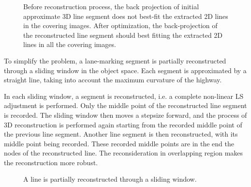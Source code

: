 \begin{figure} [h!]
	\centering
	
	\caption{\small Before reconstruction process, the back projection of initial approximate 3D line segment does not best-fit the extracted 2D lines in the covering images. After optimization, the back-projection of the reconstructed line segment should best fitting the extracted 2D lines in all the covering images.}
	\label{fig:mainidea}
\end{figure}


To simplify the problem, a lane-marking segment is partially reconstructed through a sliding window in the object space. Each segment is approximated by a straight line, taking into account the maximum curvature of the highway. 

In each sliding window, a segment is reconstructed, i.e. a complete non-linear LS adjustment is performed. Only the middle point of the reconstructed line segment is recorded. The sliding window then moves a stepsize forward, and the process of 3D reconstruction is performed again starting from the recorded middle point of the previous line segment. Another line segment is then reconstructed, with its middle point being recorded. These recorded middle points are in the end the nodes of the reconstructed line. The reconsideration in overlapping region makes the reconstruction more robust.

\begin{figure}
	\centering
	
	
	
	\caption{\small A line is partially reconstructed through a sliding window.}
	\label{fig:slidingwindow}
\end{figure}

